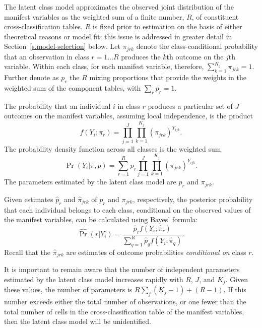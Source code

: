 \documentclass[letterpaper,12pt]{article}
\begin{document}
The latent class model approximates the observed joint distribution of the manifest variables as the weighted sum of a finite number, $R$, of constituent cross-classification tables.  $R$ is fixed prior to estimation on the basis of either theoretical reasons or model fit; this issue is addressed in greater detail in Section~\ref{s.model-selection} below.  Let $\pi_{jrk}$ denote the class-conditional probability that an observation in class $r=1 \ldots R$ produces the $k$th outcome on the $j$th variable. Within each class, for each manifest variable, therefore, $\sum_{k=1}^{K_j} \pi_{jrk}=1$.  Further denote as $p_r$ the $R$ mixing proportions that provide the weights in the weighted sum of the component tables, with $\sum_r p_r=1$.

The probability that an individual $i$ in class $r$ produces a particular set of $J$ outcomes on the manifest variables, assuming local independence, is the product
\begin{equation}
f(Y_i;\pi_r) = \prod_{j=1}^J \prod_{k=1}^{K_j}
(\pi_{jrk})^{Y_{ijk}}.\label{eq.probf}
\end{equation}
The probability density function across all classes is the weighted sum
\begin{equation}
\Pr(Y_i | \pi, p) = \sum_{r=1}^R p_r \prod_{j=1}^J \prod_{k=1}^{K_j}
(\pi_{jrk})^{Y_{ijk}}.
\end{equation}
The parameters estimated by the latent class model are $p_r$ and
$\pi_{jrk}$.

Given estimates $\hat p_r$ and $\hat \pi_{jrk}$ of $p_r$ and $\pi_{jrk}$, respectively, the posterior probability that each individual belongs to each class, conditional on the observed values of the manifest variables, can be calculated using Bayes' formula:
\begin{equation}
\widehat{\Pr}(r|Y_i) =\frac{\hat p_r f(Y_i;\hat \pi_r)}{\sum_{q=1}^R \hat p_q f(Y_i;\hat \pi_q)}. \label{eq.posterior}
\end{equation}
Recall that the $\hat \pi_{jrk}$ are estimates of outcome probabilities \emph{conditional on} class $r$.

It is important to remain aware that the number of independent parameters estimated by the latent class model increases rapidly with $R$, $J$, and $K_j$. Given these values, the number of parameters is $R \sum_j (K_j-1) + (R-1)$.  If this number exceeds either the total number of observations, or one fewer than the total number of cells in the cross-classification table of the manifest variables, then the latent class model will be unidentified.
\end{document}
